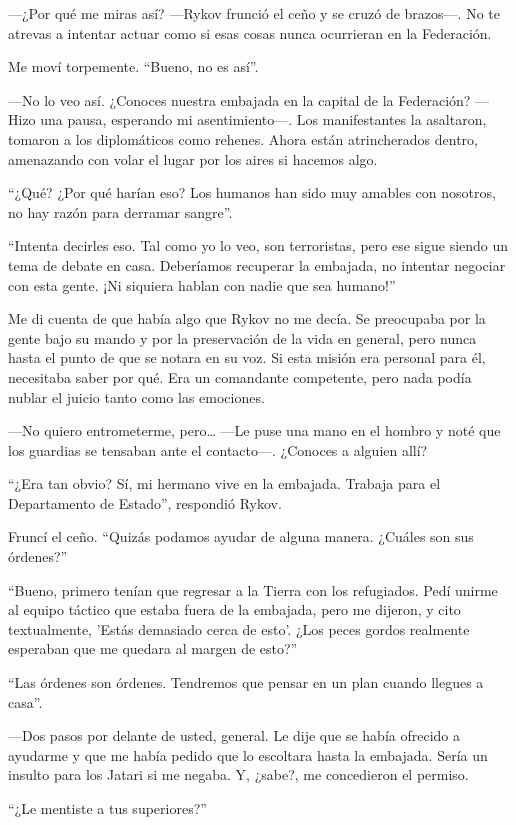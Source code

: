 —¿Por qué me miras así? —Rykov frunció el ceño y se cruzó de brazos—. No te atrevas a intentar actuar como si esas cosas nunca ocurrieran en la Federación.

Me moví torpemente. ``Bueno, no es así''.

—No lo veo así. ¿Conoces nuestra embajada en la capital de la Federación? —Hizo una pausa, esperando mi asentimiento—. Los manifestantes la asaltaron, tomaron a los diplomáticos como rehenes. Ahora están atrincherados dentro, amenazando con volar el lugar por los aires si hacemos algo.

``¿Qué? ¿Por qué harían eso? Los humanos han sido muy amables con nosotros, no hay razón para derramar sangre''.

``Intenta decirles eso. Tal como yo lo veo, son terroristas, pero ese sigue siendo un tema de debate en casa. Deberíamos recuperar la embajada, no intentar negociar con esta gente. ¡Ni siquiera hablan con nadie que sea humano!''

Me di cuenta de que había algo que Rykov no me decía. Se preocupaba por la gente bajo su mando y por la preservación de la vida en general, pero nunca hasta el punto de que se notara en su voz. Si esta misión era personal para él, necesitaba saber por qué. Era un comandante competente, pero nada podía nublar el juicio tanto como las emociones.

—No quiero entrometerme, pero… —Le puse una mano en el hombro y noté que los guardias se tensaban ante el contacto—. ¿Conoces a alguien allí?

``¿Era tan obvio? Sí, mi hermano vive en la embajada. Trabaja para el Departamento de Estado'', respondió Rykov.

Fruncí el ceño. ``Quizás podamos ayudar de alguna manera. ¿Cuáles son sus órdenes?''

``Bueno, primero tenían que regresar a la Tierra con los refugiados. Pedí unirme al equipo táctico que estaba fuera de la embajada, pero me dijeron, y cito textualmente, 'Estás demasiado cerca de esto'. ¿Los peces gordos realmente esperaban que me quedara al margen de esto?''

``Las órdenes son órdenes. Tendremos que pensar en un plan cuando llegues a casa''.

—Dos pasos por delante de usted, general. Le dije que se había ofrecido a ayudarme y que me había pedido que lo escoltara hasta la embajada. Sería un insulto para los Jatari si me negaba. Y, ¿sabe?, me concedieron el permiso.

``¿Le mentiste a tus superiores?''

